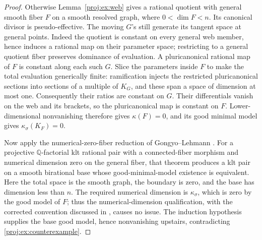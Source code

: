 \documentclass[11pt,letterpaper]{article}
\theoremstyle{definition}
\theoremstyle{remark}
\begin{document}
\begin{proof}
Otherwise Lemma~\ref{proj:ex:web} gives a rational quotient with general
smooth fiber \(F\) on a smooth resolved graph, where
\(0<\dim F<n\). Its canonical divisor is pseudo-effective.
The moving \(G\)'s still generate its tangent space at general
points. Indeed the quotient is constant on every general web
member, hence induces a rational map on their parameter space;
restricting to a general quotient fiber preserves dominance of
evaluation. A pluricanonical rational map of \(F\) is constant
along each such \(G\). Slice the parameters inside \(F\) to make
the total evaluation generically finite: ramification injects the
restricted pluricanonical sections into sections of a multiple of
\(K_G\), and these span a space of dimension at most one.
Consequently their ratios are constant on \(G\). Their
differentials vanish on the web and its brackets, so the
pluricanonical map is constant on \(F\). Lower-dimensional
nonvanishing therefore gives \(\kappa(F)=0\), and its good minimal
model gives \(\kappa_\sigma(K_F)=0\).

Now apply the numerical-zero-fiber reduction of
Gongyo--Lehmann \cite[Theorem~1.3 and Corollary~4.5]{Proj-GongyoLehmann2013}.
For a projective \(\mathbb{Q}\)-factorial klt rational pair with a
connected-fiber morphism and numerical dimension zero on the
general fiber, that theorem produces a klt pair on a smooth
birational base whose good-minimal-model existence is equivalent.
Here the total space is the smooth graph, the boundary is zero,
and the base has dimension less than \(n\). The required numerical
dimension is \(\kappa_\sigma\), which is zero by the good model of
\(F\); thus the numerical-dimension qualification, with the
corrected convention discussed in
\cite[Section~3 and Theorem~3.2]{Proj-Fujino2019Numerical},
causes no issue. The induction hypothesis supplies the base good
model, hence nonvanishing upstairs, contradicting
\eqref{proj:ex:counterexample}.
\end{proof}
\end{document}
